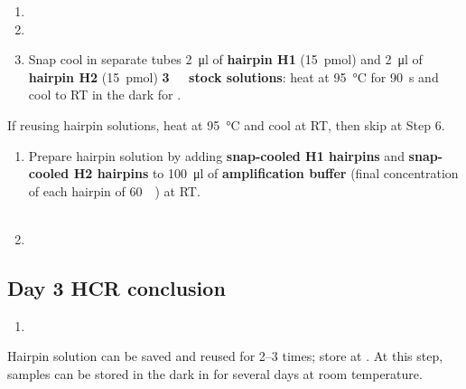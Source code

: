 \documentclass[10pt]{report}
\begin{document}
\begin{enumerate}[resume = steps]
	\item {}
	\item {}
	\item Snap cool in separate tubes \qty{2}{\ul} of \textbf{hairpin H1} (\qty{15}{\pmol}) and \qty{2}{\ul} of \textbf{hairpin H2} (\qty{15}{\pmol}) \textbf{\qty{3}{\micro\molar} stock solutions}: heat at \qty{95}{\degreeCelsius} for \qty{90}{\s} and cool to RT in the dark for \halfhour.
\end{enumerate}

\bigskip\alert{If reusing hairpin solutions, heat at \qty{95}{\degreeCelsius} and cool at RT, then skip at Step 6.}

\begin{enumerate}[resume = steps]
	\item Prepare hairpin solution by adding \textbf{snap-cooled H1 hairpins} and \textbf{snap-cooled H2 hairpins} to \qty{100}{\ul} of \textbf{amplification buffer} (final concentration of each hairpin of \qty{60}{\nano\molar}) at RT.\\
	      \\
	\item {}
\end{enumerate}

\subsection*{Day 3 \textendash{} HCR conclusion}

\begin{enumerate}[series = steps]
	\item {}
\end{enumerate}

\bigskip\alert{Hairpin solution can be saved and reused for 2--3 times; store at \minustwenty.}
\alert{At this step, samples can be stored in the dark in \ssct for several days at room temperature.}
\end{document}

